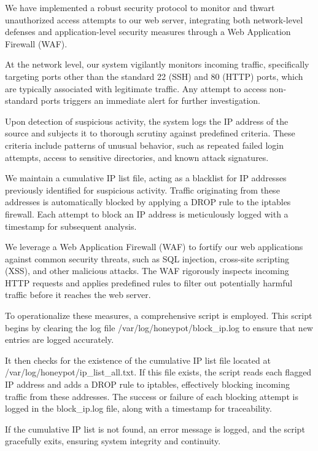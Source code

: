We have implemented a robust security protocol to monitor and thwart unauthorized access attempts to our web server, integrating both network-level defenses and application-level security measures through a Web Application Firewall (WAF).

At the network level, our system vigilantly monitors incoming traffic, specifically targeting ports other than the standard 22 (SSH) and 80 (HTTP) ports, which are typically associated with legitimate traffic. Any attempt to access non-standard ports triggers an immediate alert for further investigation.

Upon detection of suspicious activity, the system logs the IP address of the source and subjects it to thorough scrutiny against predefined criteria. These criteria include patterns of unusual behavior, such as repeated failed login attempts, access to sensitive directories, and known attack signatures.

We maintain a cumulative IP list file, acting as a blacklist for IP addresses previously identified for suspicious activity. Traffic originating from these addresses is automatically blocked by applying a DROP rule to the iptables firewall. Each attempt to block an IP address is meticulously logged with a timestamp for subsequent analysis.

We leverage a Web Application Firewall (WAF) to fortify our web applications against common security threats, such as SQL injection, cross-site scripting (XSS), and other malicious attacks. The WAF rigorously inspects incoming HTTP requests and applies predefined rules to filter out potentially harmful traffic before it reaches the web server.

To operationalize these measures, a comprehensive script is employed. This script begins by clearing the log file /var/log/honeypot/block_ip.log to ensure that new entries are logged accurately.

It then checks for the existence of the cumulative IP list file located at /var/log/honeypot/ip_list_all.txt. If this file exists, the script reads each flagged IP address and adds a DROP rule to iptables, effectively blocking incoming traffic from these addresses. The success or failure of each blocking attempt is logged in the block_ip.log file, along with a timestamp for traceability.

If the cumulative IP list is not found, an error message is logged, and the script gracefully exits, ensuring system integrity and continuity.

